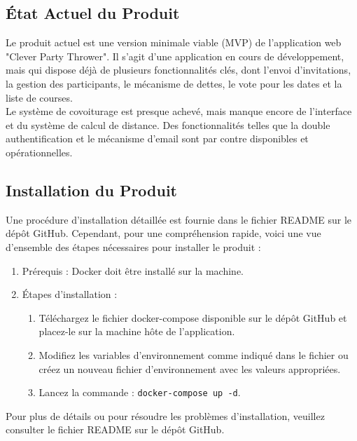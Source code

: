 \subsection{État Actuel du Produit}\label{subsec:etat-actuel-du-produit}

Le produit actuel est une version minimale viable (MVP) de l'application web "Clever Party Thrower".
Il s'agit d'une application en cours de développement, mais qui dispose déjà de plusieurs fonctionnalités clés, dont l'envoi d'invitations,
la gestion des participants, le mécanisme de dettes, le vote pour les dates et la liste de courses.\\

Le système de covoiturage est presque achevé, mais manque encore de l'interface et du système de calcul de distance.
Des fonctionnalités telles que la double authentification et le mécanisme d'email sont par contre disponibles et opérationnelles.

\subsection{Installation du Produit}\label{subsec:installation-du-produit}

Une procédure d'installation détaillée est fournie dans le fichier README sur le dépôt GitHub.
Cependant, pour une compréhension rapide,
voici une vue d'ensemble des étapes nécessaires pour installer le produit :

\begin{enumerate}
    \item Prérequis : Docker doit être installé sur la machine.
    \item Étapes d'installation :
    \begin{enumerate}
        \item Téléchargez le fichier docker-compose disponible sur le dépôt GitHub et placez-le sur la machine hôte de l'application.
        \item Modifiez les variables d'environnement comme indiqué dans le fichier ou créez un nouveau fichier d'environnement avec les valeurs appropriées.
        \item Lancez la commande : \texttt{docker-compose up -d}.
    \end{enumerate}
\end{enumerate}

Pour plus de détails ou pour résoudre les problèmes d'installation, veuillez consulter le fichier README sur le dépôt GitHub.

